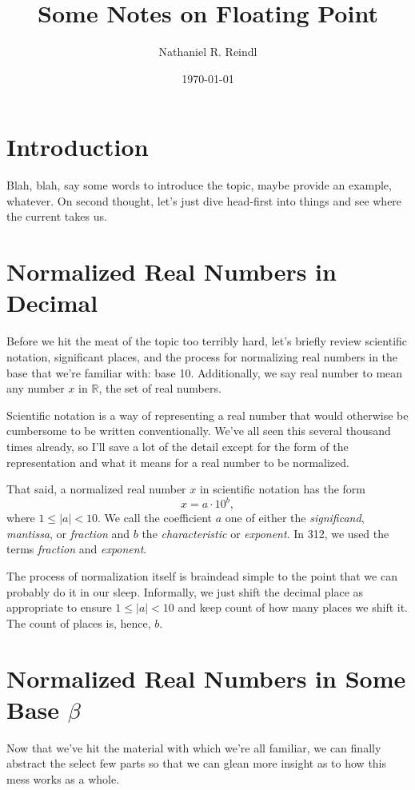 \documentclass[letterpaper,12pt]{article}
\title{Some Notes on Floating Point}
\author{Nathaniel R. Reindl}
\date{\today}
\theoremstyle{remark}
\theoremstyle{definition}
\begin{document}
\section{Introduction}

Blah, blah, say some words to introduce the topic, maybe provide an
example, whatever.  On second thought, let's just dive head-first into
things and see where the current takes us.

\section{Normalized Real Numbers in Decimal}

Before we hit the meat of the topic too terribly hard, let's briefly
review scientific notation, significant places, and the process for
normalizing real numbers in the base that we're familiar with: base
10.  Additionally, we say real number to mean any number $x$ in
$\mathbb{R}$, the set of real numbers.

Scientific notation is a way of representing a real number that would
otherwise be cumbersome to be written conventionally.  We've all seen
this several thousand times already, so I'll save a lot of the detail
except for the form of the representation and what it means for a real
number to be normalized.

That said, a normalized real number $x$ in scientific notation has the
form
\begin{equation}
  x = a \cdot 10^b,
\end{equation}
where $1\leq \left | a \right | < 10$.  We call the coefficient $a$
one of either the {\it significand}, {\it mantissa}, or {\it fraction}
and $b$ the {\it characteristic} or {\it exponent}.  In 312, we used
the terms {\it fraction} and {\it exponent}.

The process of normalization itself is braindead simple to the point
that we can probably do it in our sleep.  Informally, we just shift
the decimal place as appropriate to ensure $1\leq \left | a \right | <
10$ and keep count of how many places we shift it.  The count of
places is, hence, $b$.

\section{Normalized Real Numbers in Some Base $\beta$}

Now that we've hit the material with which we're all familiar, we can
finally abstract the select few parts so that we can glean more
insight as to how this mess works as a whole.
\end{document}
